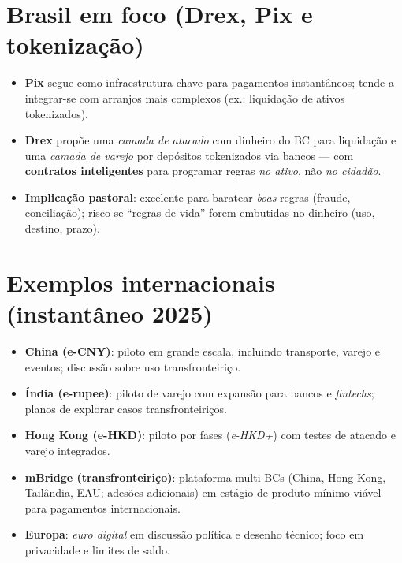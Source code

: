 \section{Brasil em foco (Drex, Pix e tokenização)}
\begin{itemize}[leftmargin=*,noitemsep]
  \item \textbf{Pix} segue como infraestrutura-chave para pagamentos instantâneos; tende a integrar-se com arranjos mais complexos (ex.: liquidação de ativos tokenizados).
  \item \textbf{Drex} propõe uma \emph{camada de atacado} com dinheiro do BC para liquidação e uma \emph{camada de varejo} por depósitos tokenizados via bancos --- com \textbf{contratos inteligentes} para programar regras \emph{no ativo}, não \emph{no cidadão}.
  \item \textbf{Implicação pastoral}: excelente para baratear \emph{boas} regras (fraude, conciliação); risco se “regras de vida” forem embutidas no dinheiro (uso, destino, prazo).
\end{itemize}

\section{Exemplos internacionais (instantâneo 2025)}
\begin{itemize}[leftmargin=*,noitemsep]
  \item \textbf{China (e-CNY)}: piloto em grande escala, incluindo transporte, varejo e eventos; discussão sobre uso transfronteiriço.
  \item \textbf{Índia (e-rupee)}: piloto de varejo com expansão para bancos e \emph{fintechs}; planos de explorar casos transfronteiriços.
  \item \textbf{Hong Kong (e-HKD)}: piloto por fases (\emph{e-HKD+}) com testes de atacado e varejo integrados.
  \item \textbf{mBridge (transfronteiriço)}: plataforma multi-BCs (China, Hong Kong, Tailândia, EAU; adesões adicionais) em estágio de produto mínimo viável para pagamentos internacionais.
  \item \textbf{Europa}: \emph{euro digital} em discussão política e desenho técnico; foco em privacidade e limites de saldo.
\end{itemize}

